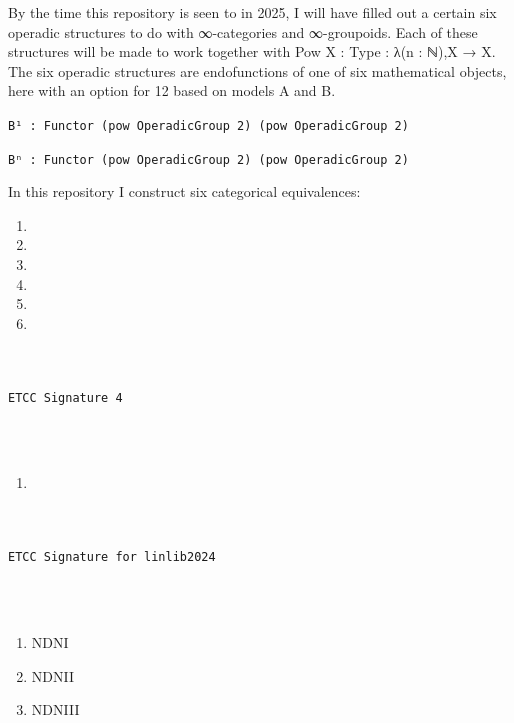 \documentclass{book}
\theoremstyle{definition}
\renewcommand{\chapter}[1]{
\newpage
{
\Huge 
\begin{center}
\ \\
\ \\
\thispagestyle{empty}
\texttt{#1}
\end{center}}
\ \\
\ \\
}
\begin{document}
\newpage

By the time this repository is seen to in 2025, I will have filled out a certain six operadic structures to do with ∞-categories and ∞-groupoids. Each of these structures will be made to work together with Pow {X : Type} : λ(n : ℕ),X → X. The six operadic structures are endofunctions of one of six mathematical objects, here with an option for 12 based on models A and B. 

\begin{center}
\texttt{B¹ : Functor (pow OperadicGroup 2) (pow OperadicGroup 2)}
\end{center}

\begin{center}
\texttt{Bⁿ : Functor (pow OperadicGroup 2) (pow OperadicGroup 2)}
\end{center}

In this repository I construct six categorical equivalences:

\begin{enumerate}
\item 
\item
\item
\item
\item
\item
\end{enumerate}

\chapter{ETCC Signature 4}

\begin{enumerate}
\item 
\end{enumerate}

\iffalse

\chapter{ETCC Signature for linlib2024}


\iffalse
\begin{enumerate}
\item NDNI 
\item NDNII 
\item NDNIII 
\end{enumerate}
\end{document}
